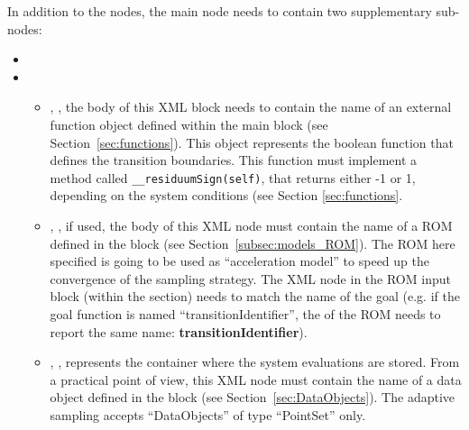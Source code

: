  In addition to the  nodes, the main
 node needs to contain two supplementary
sub-nodes:

\begin{itemize}
  \item \convergenceDescription
  \item {}
    \begin{itemize}
      \item {}, ,  the
        body of this XML block needs to contain the name of an external
        function object defined within the  main block (see
        Section~\ref{sec:functions}).
        This object represents the boolean function that defines the transition
        boundaries.
        This function must implement a method called
        \texttt{\_\_residuumSign(self)}, that returns either -1 or 1, depending
        on the system conditions (see Section \ref{sec:functions}.
      \item {}, , if used, the
        body of this XML node must contain the name of a ROM defined in the
         block (see Section~\ref{subsec:models_ROM}). The ROM
        here specified is going to be used as ``acceleration model'' to speed up the
        convergence of the sampling strategy. The  XML node in the ROM
        input block (within the  section) needs to match the name of the goal
         (e.g. if the goal function is named ``transitionIdentifier'', the  of the
        ROM needs to report the same name: \textbf{transitionIdentifier}).
      \item {}, ,
        represents the container where the system evaluations are stored.
        From a practical point of view, this XML node must contain the name of
        a data object defined in the  block (see
        Section~\ref{sec:DataObjects}).
        The adaptive sampling accepts ``DataObjects'' of type
        ``PointSet'' only.
    \end{itemize}
\end{itemize}


